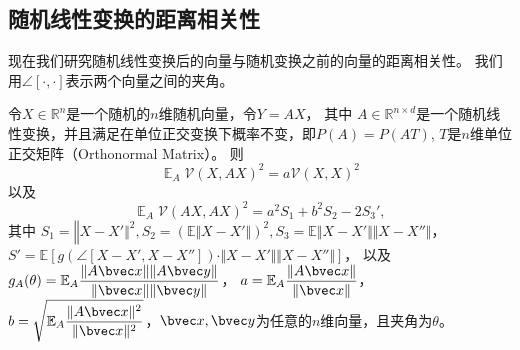 \subsection{随机线性变换的距离相关性}
现在我们研究随机线性变换后的向量与随机变换之前的向量的距离相关性。
我们用$\angle[\cdot, \cdot]$表示两个向量之间的夹角。
\begin{theorem}
\label{thm:ss-perm:linear-dcov}
    令$X\in \mathbb R^n$是一个随机的$n$维随机向量，令$Y = AX$，
    其中 $A \in \mathbb R^{n \times d}$是一个随机线性变换，并且满足在单位正交变换下概率不变，即$P(A) = P(AT)$, $T$是$n$维单位正交矩阵（Orthonormal Matrix）。
    则
    \begin{equation}
    \label{eq:ss-perm:linear-dcov1}
            \mathop{\mathbb E}_A \mathcal{V}(X, AX)^2 = a\mathcal{V}(X, X)^2
    \end{equation}
    以及    
    \begin{equation}
    \label{eq:ss-perm:linear-dcov2}
        \mathop{\mathbb E}_A \mathcal{V}(AX, AX)^2 = {a^2S_1 + b^2S_2 - 2S_3'},
    \end{equation}
    其中 $S_1 = \mathbb \Vert X - X'\Vert^2, S_2 = \left( \mathbb E \Vert X - X'\Vert \right)^2, S_3 = \mathbb E \Vert X - X' \Vert \Vert X - X'' \Vert$，\\
    $S' = \mathbb E \left[ g(\angle [X - X', X - X'']) \cdot \Vert X - X'\Vert \Vert X - X'' \Vert \right]$，
    以及
    $g_A(\theta) = \mathbb E_A \dfrac{\Vert A\bvec x \Vert \Vert A\bvec y \Vert}{\Vert \bvec x \Vert \Vert \bvec y \Vert} $，
    $a = \mathbb E_A \dfrac{\Vert A\bvec x \Vert}{\Vert \bvec x \Vert}$，
    $b = \sqrt{\mathbb E_A \dfrac{\Vert A\bvec x \Vert^2}{\Vert \bvec x \Vert^2}}$，$\bvec x, \bvec y$为任意的$n$维向量，且夹角为$\theta$。
\end{theorem}
